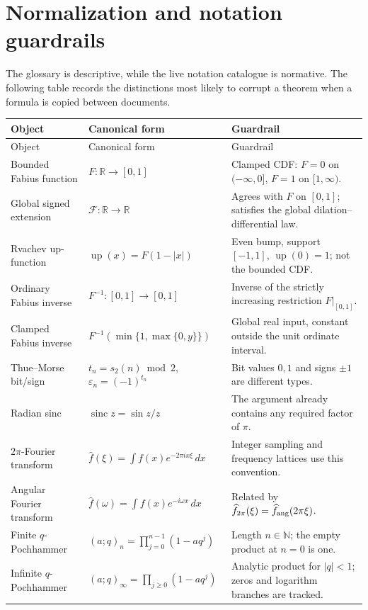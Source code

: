 \documentclass[11pt,oneside]{article}
\newcommand{\R}{\mathbb R}
\newcommand{\N}{\mathbb N}
\newcommand{\Up}{\operatorname{up}}
\newcommand{\sinc}{\operatorname{sinc}}
\begin{document}
\appendix
\section{Normalization and notation guardrails}
The glossary is descriptive, while the live notation catalogue is normative.
The following table records the distinctions most likely to corrupt a theorem
when a formula is copied between documents.
\begingroup\small\renewcommand{\arraystretch}{1.15}
\begin{longtable}{@{}L{0.22\textwidth}L{0.29\textwidth}L{0.43\textwidth}@{}}
\toprule Object & Canonical form & Guardrail\\ \midrule\endfirsthead
\toprule Object & Canonical form & Guardrail\\ \midrule\endhead
Bounded Fabius function & \(F:\R\to[0,1]\) & Clamped CDF: \(F=0\) on \((-\infty,0]\), \(F=1\) on \([1,\infty)\). \\
Global signed extension & \(\mathcal F:\R\to\R\) & Agrees with \(F\) on \([0,1]\); satisfies the global dilation--differential law. \\
Rvachev up-function & \(\Up(x)=F(1-|x|)\) & Even bump, support \([-1,1]\), \(\Up(0)=1\); not the bounded CDF. \\
Ordinary Fabius inverse & \(F^{-1}:[0,1]\to[0,1]\) & Inverse of the strictly increasing restriction \(F|_{[0,1]}\). \\
Clamped Fabius inverse & \(F^{-1}(\min\{1,\max\{0,y\}\})\) & Global real input, constant outside the unit ordinate interval. \\
Thue--Morse bit/sign & \(t_n=s_2(n)\bmod2\), \(\varepsilon_n=(-1)^{t_n}\) & Bit values \(0,1\) and signs \(\pm1\) are different types. \\
Radian sinc & \(\sinc z=\sin z/z\) & The argument already contains any required factor of \(\pi\). \\
\(2\pi\)-Fourier transform & \(\widehat f(\xi)=\int f(x)e^{-2\pi i x\xi}\,dx\) & Integer sampling and frequency lattices use this convention. \\
Angular Fourier transform & \(\widehat f(\omega)=\int f(x)e^{-i\omega x}\,dx\) & Related by \(\widehat f_{2\pi}(\xi)=\widehat f_{\rm ang}(2\pi\xi)\). \\
Finite \(q\)-Pochhammer & \((a;q)_n=\prod_{j=0}^{n-1}(1-aq^j)\) & Length \(n\in\N\); the empty product at \(n=0\) is one. \\
Infinite \(q\)-Pochhammer & \((a;q)_\infty=\prod_{j\ge0}(1-aq^j)\) & Analytic product for \(|q|<1\); zeros and logarithm branches are tracked. \\

\end{longtable}
\end{document}
